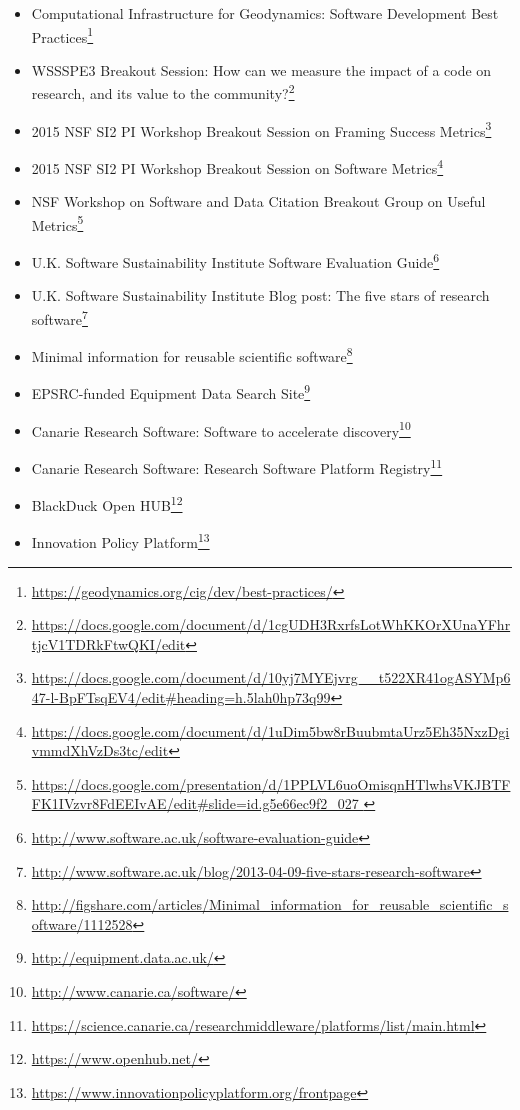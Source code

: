 \begin{itemize}

\item
Computational Infrastructure for Geodynamics: Software Development Best Practices\footnote{\url{https://geodynamics.org/cig/dev/best-practices/}}

\item
WSSSPE3 Breakout Session: How can we measure the impact of a code on research, and its value to the community?\footnote{\url{https://docs.google.com/document/d/1cgUDH3RxrfsLotWhKKOrXUnaYFhrtjcV1TDRkFtwQKI/edit}}

\item
2015 NSF SI2 PI Workshop Breakout Session on Framing Success Metrics\footnote{\url{https://docs.google.com/document/d/10yj7MYEjvrg__t522XR41ogASYMp647-l-BpFTsqEV4/edit#heading=h.5lah0hp73q99}}

\item
2015 NSF SI2 PI Workshop Breakout Session on Software Metrics\footnote{\url{https://docs.google.com/document/d/1uDim5bw8rBuubmtaUrz5Eh35NxzDgivmmdXhVzDs3tc/edit}}

\item
NSF Workshop on Software and Data Citation Breakout Group on Useful Metrics\footnote{\url{https://docs.google.com/presentation/d/1PPLVL6uoOmisqnHTlwhsVKJBTFFK1IVzvr8FdEEIvAE/edit#slide=id.g5e66ec9f2_027
}}

\item
U.K. Software Sustainability Institute Software Evaluation Guide\footnote{\url{http://www.software.ac.uk/software-evaluation-guide}}

\item
U.K. Software Sustainability Institute Blog post: The five stars of research software\footnote{\url{http://www.software.ac.uk/blog/2013-04-09-five-stars-research-software}}

\item
Minimal information for reusable scientific software\footnote{\url{http://figshare.com/articles/Minimal_information_for_reusable_scientific_software/1112528}}

\item
EPSRC-funded Equipment Data Search Site\footnote{\url{http://equipment.data.ac.uk/}}

\item
Canarie Research Software: Software to accelerate discovery\footnote{\url{http://www.canarie.ca/software/}}

\item
Canarie Research Software: Research Software Platform Registry\footnote{\url{https://science.canarie.ca/researchmiddleware/platforms/list/main.html}}

\item
BlackDuck Open HUB\footnote{\url{https://www.openhub.net/}}

\item
Innovation Policy Platform\footnote{\url{https://www.innovationpolicyplatform.org/frontpage}}


\end{itemize}


